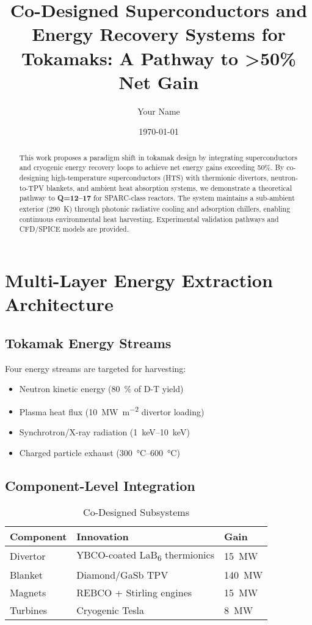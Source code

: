 \documentclass{article}
\title{Co-Designed Superconductors and Energy Recovery Systems for Tokamaks: A Pathway to >50\% Net Gain}
\author{Your Name}
\date{\today}
\begin{document}
\maketitle

\begin{abstract}
This work proposes a paradigm shift in tokamak design by integrating superconductors and cryogenic energy recovery loops to achieve net energy gains exceeding 50\%. By co-designing high-temperature superconductors (HTS) with thermionic divertors, neutron-to-TPV blankets, and ambient heat absorption systems, we demonstrate a theoretical pathway to \textbf{Q=12–17} for SPARC-class reactors. The system maintains a sub-ambient exterior (\SI{290}{K}) through photonic radiative cooling and adsorption chillers, enabling continuous environmental heat harvesting. Experimental validation pathways and CFD/SPICE models are provided.
\end{abstract}

\section{Multi-Layer Energy Extraction Architecture}
\label{sec:architecture}

\subsection{Tokamak Energy Streams}
Four energy streams are targeted for harvesting:
\begin{itemize}
    \item Neutron kinetic energy (\SI{80}{\%} of D-T yield)
    \item Plasma heat flux (\SI{10}{\mega\watt\per\square\meter} divertor loading)
    \item Synchrotron/X-ray radiation (\SI{1}{keV}–\SI{10}{keV})
    \item Charged particle exhaust (\SI{300}{\degreeCelsius}–\SI{600}{\degreeCelsius})
\end{itemize}

\subsection{Component-Level Integration}
\begin{table}[ht]
    \centering
    \caption{Co-Designed Subsystems}
    \label{tab:subsystems}
    \begin{tabular}{lll}
        \toprule
        \textbf{Component} & \textbf{Innovation} & \textbf{Gain} \\
        \midrule
        Divertor & YBCO-coated LaB\textsubscript{6} thermionics & \SI{15}{\mega\watt} \\
        Blanket & Diamond/GaSb TPV & \SI{140}{\mega\watt} \\
        Magnets & REBCO + Stirling engines & \SI{15}{\mega\watt} \\
        Turbines & Cryogenic Tesla & \SI{8}{\mega\watt} \\
        \bottomrule
    \end{tabular}
\end{table}
\end{document}
